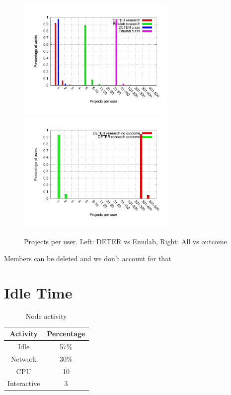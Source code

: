 \documentclass[10pt, twocolumn]{article} %
\begin{document}
\begin{figure}[htbp] \begin{center} \includegraphics[width=3in,
type=pdf,ext=.pdf,read=.pdf]{figs/user.proj.gnu}
\includegraphics[width=3in,
type=pdf,ext=.pdf,read=.pdf]{figs/user.proj.cmp.gnu} \caption{Projects
per user. Left: DETER vs Emulab, Right: All vs outcome} \label{userproj}
\end{center} \end{figure}

Members can be deleted and we don't account for that


\section{Idle Time}

\begin{table}[htdp] \caption{Node activity} \begin{center}
\begin{tabular}{|c|c|} \hline Activity & Percentage \\ \hline Idle &
57\% \\ Network & 30\% \\ CPU & 10\\ Interactive & 3 \\ \hline
\end{tabular} \end{center} \label{default} \end{table}%
\end{document}
